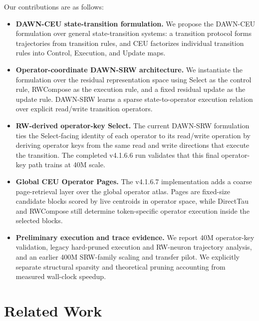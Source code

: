 \documentclass{article}
\begin{document}
Our contributions are as follows:
\begin{itemize}
    \item \textbf{DAWN-CEU state-transition formulation.} We propose the DAWN-CEU formulation over general state-transition systems: a transition protocol forms trajectories from transition rules, and CEU factorizes individual transition rules into Control, Execution, and Update maps.
    \item \textbf{Operator-coordinate DAWN-SRW architecture.} We instantiate the formulation over the residual representation space using Select as the control rule, RWCompose as the execution rule, and a fixed residual update as the update rule. DAWN-SRW learns a sparse state-to-operator execution relation over explicit read/write transition operators.
    \item \textbf{RW-derived operator-key Select.} The current DAWN-SRW formulation ties the Select-facing identity of each operator to its read/write operation by deriving operator keys from the same read and write directions that execute the transition. The completed v4.1.6.6 run validates that this final operator-key path trains at 40M scale.
    \item \textbf{Global CEU Operator Pages.} The v4.1.6.7 implementation adds a coarse page-retrieval layer over the global operator atlas. Pages are fixed-size candidate blocks scored by live centroids in operator space, while DirectTau and RWCompose still determine token-specific operator execution inside the selected blocks.
    \item \textbf{Preliminary execution and trace evidence.} We report 40M operator-key validation, legacy hard-pruned execution and RW-neuron trajectory analysis, and an earlier 400M SRW-family scaling and transfer pilot. We explicitly separate structural sparsity and theoretical pruning accounting from measured wall-clock speedup.
\end{itemize}

\section{Related Work}
\end{document}
